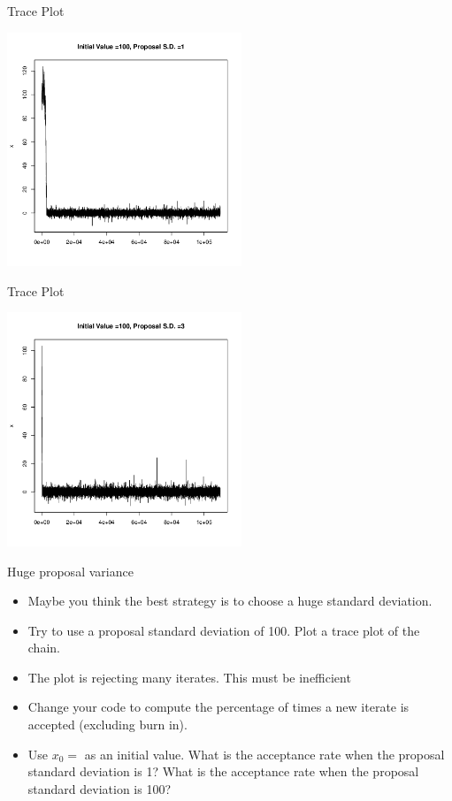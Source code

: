 \documentclass[10pt]{beamer}
\begin{document}
\begin{frame}{Trace Plot}
\begin{center}
\includegraphics[height=7cm]{./Pics/sp2.png}
\end{center}
\end{frame}
\begin{frame}{Trace Plot}
\begin{center}
\includegraphics[height=7cm]{./Pics/sp3.png}
\end{center}
\end{frame}
\begin{frame}{Huge proposal variance}
\begin{itemize}
\item Maybe you think the best strategy is to choose a huge standard deviation.

\item Try to use a proposal standard deviation of 100.  Plot a trace plot of the chain.

\item The plot is rejecting many iterates.  This must be inefficient

\item Change your code to compute the percentage of times a new iterate is accepted (excluding burn in).

\item Use $x_0=$ as an initial value.  What is the acceptance rate when the proposal standard deviation is 1?  What is the acceptance rate when the proposal standard deviation is 100?
\end{itemize}
\end{frame}
\end{document}
